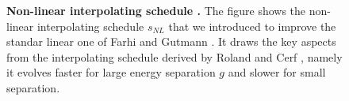 
\begin{figure}[!ht]
  \centering

  \caption{\textbf{Non-linear interpolating schedule .} The figure shows the non-linear interpolating schedule $s_{NL}$ that we introduced to improve the standar linear one of Farhi and Gutmann \cite{Farhi2000}. It draws the key aspects from the interpolating schedule derived by Roland and Cerf \cite{Roland2002}, namely it evolves faster for large energy separation $g$ and slower for small separation.}
  \label{fig:interpolating_schedule_compared}
\end{figure}
